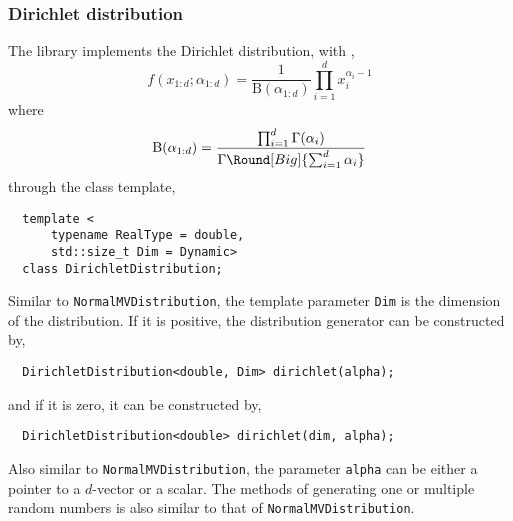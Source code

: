 \subsubsection{Dirichlet distribution}

The library implements the Dirichlet distribution, with \pdf,
\begin{equation*}
  f(x_{1:d};\alpha_{1:d}) = \frac{1}{\mathrm{B}(\alpha_{1:d})}
  \prod_{i=1}^d x_i^{\alpha_i - 1}
\end{equation*}
where
\begin{equation*}
  \mathrm{B}(\alpha_{1:d}) =
  \frac{\prod_{i=1}^d\Gamma(\alpha_i)}
  {\Gamma\Round[Big]{\sum_{i=1}^d\alpha_i}}
\end{equation*}
through the class template,
\begin{Verbatim}
  template <
      typename RealType = double,
      std::size_t Dim = Dynamic>
  class DirichletDistribution;
\end{Verbatim}
Similar to \verb|NormalMVDistribution|, the template parameter \verb|Dim| is
the dimension of the distribution. If it is positive, the distribution
generator can be constructed by,
\begin{Verbatim}
  DirichletDistribution<double, Dim> dirichlet(alpha);
\end{Verbatim}
and if it is zero, it can be constructed by,
\begin{Verbatim}
  DirichletDistribution<double> dirichlet(dim, alpha);
\end{Verbatim}
Also similar to \verb|NormalMVDistribution|, the parameter \verb|alpha| can be
either a pointer to a $d$-vector or a scalar. The methods of generating one or
multiple random numbers is also similar to that of \verb|NormalMVDistribution|.
